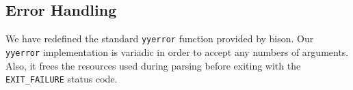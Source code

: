 \subsection{Error Handling}
We have redefined the standard \verb|yyerror| function provided by bison.
Our \verb|yyerror| implementation is variadic in order to accept any numbers of
arguments. Also, it frees the resources used during parsing before exiting with
the \verb|EXIT_FAILURE| \cite{glibc-online} status code.
